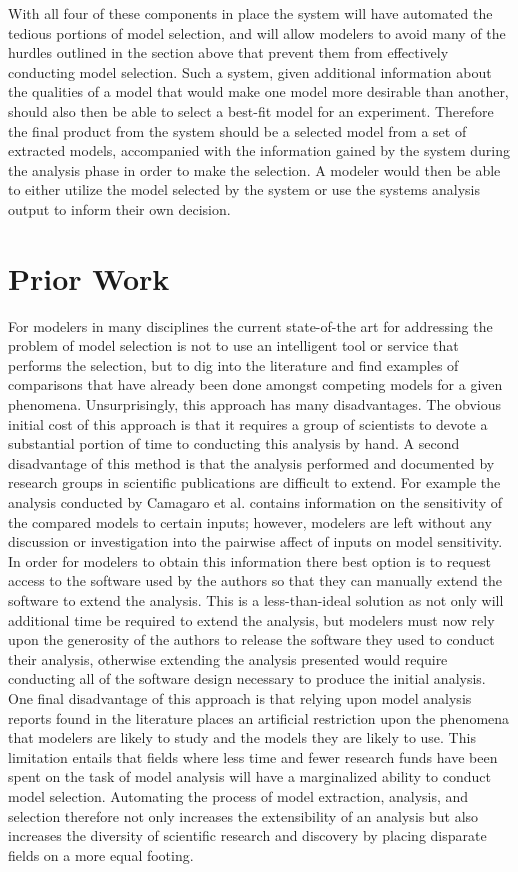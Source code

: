 With all four of these components in place the system will have automated the tedious portions of model selection, and will allow modelers to avoid many of the hurdles outlined in the section above that prevent them from effectively conducting model selection. Such a system, given additional information about the qualities of a model that would make one model more desirable than another, should also then be able to select a best-fit model for an experiment. Therefore the final product from the system should be a selected model from a set of extracted models, accompanied with the information gained by the system during the analysis phase in order to make the selection. A modeler would then be able to either utilize the model selected by the system or use the systems analysis output to inform their own decision.


\section{Prior Work\label{sec:prior_work}}
For modelers in many disciplines the current state-of-the art for addressing the problem of model selection is not to use an intelligent tool or service that performs the selection, but to dig into the literature and find examples of comparisons that have already been done amongst competing models for a given phenomena. Unsurprisingly, this approach has many disadvantages. The obvious initial cost of this approach is that it requires a group of scientists to devote a substantial portion of time to conducting this analysis by hand. A second disadvantage of this method is that the analysis performed and documented by research groups in scientific publications are difficult to extend. For example the analysis conducted by Camagaro et al. \cite{camargo2016six} contains information on the sensitivity of the compared models to certain inputs; however, modelers are left without any discussion or investigation into the pairwise affect of inputs on model sensitivity. In order for modelers to obtain this information there best option is to request access to the software used by the authors so that they can manually extend the software to extend the analysis. This is a less-than-ideal solution as not only will additional time be required to extend the analysis, but modelers must now rely upon the generosity of the authors to release the software they used to conduct their analysis, otherwise extending the analysis presented would require conducting all of the software design necessary to produce the initial analysis. One final disadvantage of this approach is that relying upon model analysis reports found in the literature places an artificial restriction upon the phenomena that modelers are likely to study and the models they are likely to use. This limitation entails that fields where less time and fewer research funds have been spent on the task of model analysis will have a marginalized ability to conduct model selection. Automating the process of model extraction, analysis, and selection therefore not only increases the extensibility of an analysis but also increases the diversity of scientific research and discovery by placing disparate fields on a more equal footing.

